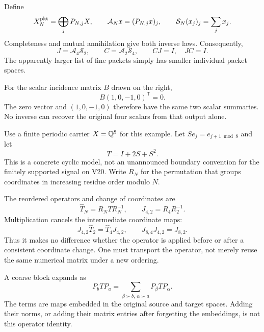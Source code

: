 Define
\[
X_N^{\rm pkt}=\bigoplus_j P_{N,j}X,
\qquad
\mathcal A_Nx=(P_{N,j}x)_j,
\qquad
\mathcal S_N(x_j)_j=\sum_jx_j.
\]
Completeness and mutual annihilation give both inverse laws. Consequently,
\[
J=\mathcal A_4\mathcal S_2,\qquad C=\mathcal A_2\mathcal S_4,
\qquad CJ=I,\quad JC=I.
\]
The apparently larger list of fine packets simply has smaller individual packet spaces.

For the scalar incidence matrix $B$ drawn on the right,
\[
B(1,0,-1,0)^\mathsf T=0.
\]
The zero vector and $(1,0,-1,0)$ therefore have the same two scalar summaries. No inverse can recover the original four scalars from that output alone.


Use a finite periodic carrier $X=\mathbb Q^8$ for this example. Let $Se_j=e_{j+1\bmod8}$ and let
\[
T=I+2S+S^2.
\]
This is a concrete cyclic model, not an unannounced boundary convention for the finitely supported signal on V20. Write $R_N$ for the permutation that groups coordinates in increasing residue order modulo $N$.


The reordered operators and change of coordinates are
\[
\widehat T_N=R_NTR_N^{-1},\qquad J_{4,2}=R_4R_2^{-1}.
\]
Multiplication cancels the intermediate coordinate maps:
\[
J_{4,2}\widehat T_2=\widehat T_4J_{4,2},\qquad
J_{8,4}J_{4,2}=J_{8,2}.
\]
Thus it makes no difference whether the operator is applied before or after a consistent coordinate change. One must transport the operator, not merely reuse the same numerical matrix under a new ordering.

A coarse block expands as
\[
P_bTP_a=\sum_{\beta\succ b,\,\alpha\succ a}P_\beta TP_\alpha.
\]
The terms are maps embedded in the original source and target spaces. Adding their norms, or adding their matrix entries after forgetting the embeddings, is not this operator identity.


